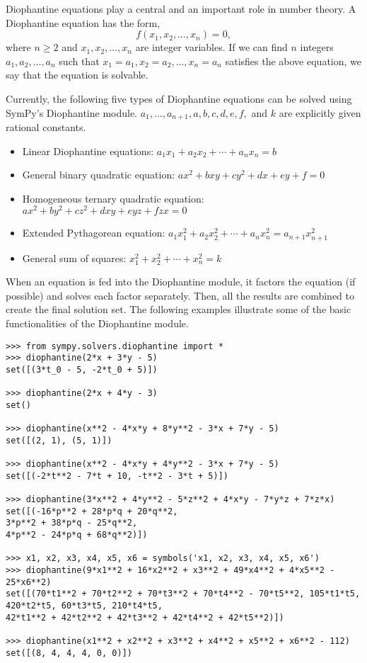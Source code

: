 Diophantine equations play a central and an important role in number theory.  A
Diophantine equation has the form, \[f(x_1, x_2, \dotsc, x_n) = 0,\] where $n \geq
2$ and $x_1, x_2, \dotsc, x_n$ are integer variables. If we can find $n$
integers $a_1, a_2, \dotsc, a_n$ such that $x_1 = a_1, x_2 = a_2, \dotsc, x_n =
a_n$ satisfies the above equation, we say that the equation is solvable.

Currently, the following five types of Diophantine equations can be solved using
SymPy's Diophantine module. $a_1, \ldots, a_{n+1}, a, b, c, d, e,
f,$ and $k$ are explicitly given rational constants.

\begin{itemize}
    \item Linear Diophantine equations: $a_1x_1 + a_2x_2 + \dotsb{} + a_{n}x_{n} = b$
    \item General binary quadratic equation: $ax^2 + bxy + cy^2 + dx + ey + f = 0$
    \item Homogeneous ternary quadratic equation: $ax^2 + by^2 + cz^2 + dxy + eyz + fzx = 0$
    \item Extended Pythagorean equation: $a_{1}x_{1}^2 + a_{2}x_{2}^2 + \dotsb{} + a_{n}x_{n}^2 = a_{n+1}x_{n+1}^2$
    \item General sum of squares: $x_{1}^2 + x_{2}^2 + \dotsb{} + x_{n}^2 = k$
\end{itemize}

When an equation is fed into the Diophantine module, it factors the equation (if
possible) and solves each factor separately. Then, all the results are combined
to create the final solution set. The following examples illustrate some of the
basic functionalities of the Diophantine module.

\begin{verbatim}
>>> from sympy.solvers.diophantine import *
>>> diophantine(2*x + 3*y - 5)
set([(3*t_0 - 5, -2*t_0 + 5)])

>>> diophantine(2*x + 4*y - 3)
set()

>>> diophantine(x**2 - 4*x*y + 8*y**2 - 3*x + 7*y - 5)
set([(2, 1), (5, 1)])

>>> diophantine(x**2 - 4*x*y + 4*y**2 - 3*x + 7*y - 5)
set([(-2*t**2 - 7*t + 10, -t**2 - 3*t + 5)])

>>> diophantine(3*x**2 + 4*y**2 - 5*z**2 + 4*x*y - 7*y*z + 7*z*x)
set([(-16*p**2 + 28*p*q + 20*q**2,
3*p**2 + 38*p*q - 25*q**2,
4*p**2 - 24*p*q + 68*q**2)])

>>> x1, x2, x3, x4, x5, x6 = symbols('x1, x2, x3, x4, x5, x6')
>>> diophantine(9*x1**2 + 16*x2**2 + x3**2 + 49*x4**2 + 4*x5**2 - 25*x6**2)
set([(70*t1**2 + 70*t2**2 + 70*t3**2 + 70*t4**2 - 70*t5**2, 105*t1*t5,
420*t2*t5, 60*t3*t5, 210*t4*t5,
42*t1**2 + 42*t2**2 + 42*t3**2 + 42*t4**2 + 42*t5**2)])

>>> diophantine(x1**2 + x2**2 + x3**2 + x4**2 + x5**2 + x6**2 - 112)
set([(8, 4, 4, 4, 0, 0)])
\end{verbatim}
